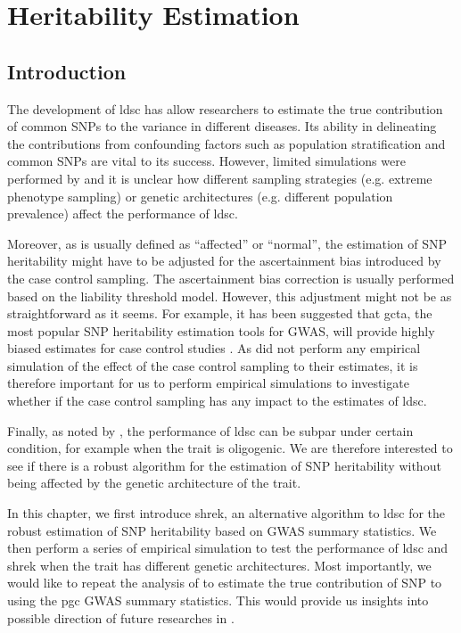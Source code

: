\chapter{Heritability Estimation}
\label{heritabilityChapter}
	\section{Introduction}
	The development of \gls{ldsc} \citep{Bulik-Sullivan2015} has allow researchers to estimate the true contribution of common \glspl{SNP} to the variance in different diseases.	
	Its ability in delineating the contributions from confounding factors such as population stratification and common \glspl{SNP} are vital to its success.
	However, limited simulations were performed by \citet{Bulik-Sullivan2015} and it is unclear how different sampling strategies (e.g. extreme phenotype sampling) or genetic architectures (e.g. different population prevalence) affect the performance of \gls{ldsc}.
	
	Moreover, as  is usually defined as ``affected'' or ``normal'', the estimation of \gls{SNP} heritability might have to be adjusted for the ascertainment bias introduced by the case control sampling. 
	The ascertainment bias correction is usually performed based on the liability threshold model.
	However, this adjustment might not be as straightforward as it seems.
	For example, it has been suggested that \gls{gcta}, the most popular \gls{SNP} heritability estimation tools for \gls{GWAS}, will provide highly biased estimates for case control studies \citep{Golan2014}.
	As \citet{Bulik-Sullivan2015} did not perform any empirical simulation of the effect of the case control sampling to their estimates, it is therefore important for us to perform empirical simulations to investigate whether if the case control sampling has any impact to the estimates of \gls{ldsc}.
	
	Finally, as noted by \citet{Bulik-Sullivan2015}, the performance of \gls{ldsc} can be subpar under certain condition, for example when the trait is oligogenic.
	We are therefore interested to see if there is a robust algorithm for the estimation of \gls{SNP} heritability without being affected by the genetic architecture of the trait.
	
	In this chapter, we first introduce \gls{shrek}, an alternative algorithm to \gls{ldsc} for the robust estimation of \gls{SNP} heritability based on \gls{GWAS} summary statistics.
	We then perform a series of empirical simulation to test the performance of \gls{ldsc} and \gls{shrek} when the trait has different genetic architectures. 
	Most importantly, we would like to repeat the analysis of \citet{Bulik-Sullivan2015} to estimate the true contribution of \gls{SNP} to  using the \gls{pgc}  \gls{GWAS} summary statistics.
	This would provide us insights into possible direction of future researches in .
	
